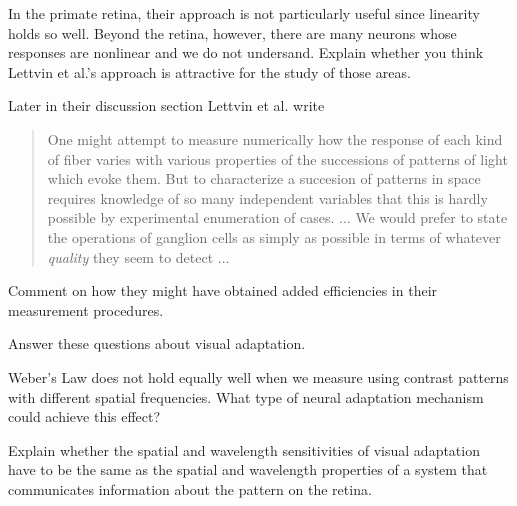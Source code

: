 In the primate retina,
their approach is not particularly useful since
linearity holds so well.
Beyond the retina, however, there are many neurons whose
responses are nonlinear and we do not undersand.
Explain whether you think
Lettvin et al.'s approach is attractive for the study of
those areas.

 \item Later in their discussion section Lettvin et al. write

\begin{quote}
One might attempt to measure numerically how the response of each kind
of fiber varies with various
properties of the successions of patterns of light which evoke them.
But to characterize a succesion of patterns in space requires
knowledge of so
many independent variables that this is hardly possible by
experimental enumeration of cases. ...
We would prefer to state the operations of ganglion cells as simply as
possible in
terms of whatever {\em quality} they seem to detect ...
\end{quote}

Comment on how they might have obtained added efficiencies in their
measurement procedures.

 \ee

\item Answer these questions about visual adaptation.

\be

 \item Weber's Law does not hold equally well when we measure using
contrast patterns with different spatial frequencies.  What type of
neural adaptation mechanism could achieve this effect?

 \item Explain whether the spatial and wavelength sensitivities of
visual adaptation have to be the same as the spatial and
wavelength properties of a system that communicates information
about the pattern on the retina.

\ee


\ee %
